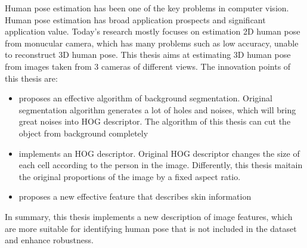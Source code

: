 
\begin{eabstract}
Human pose estimation has been one of the key problems in computer vision. Human pose estimation has broad application prospects and significant application value. Today's research mostly focuses on estimation 2D human pose from monucular camera, which has many problems such as low accuracy, unable to reconstruct 3D human pose. This thesis aims at estimating 3D human pose from images taken from 3 cameras of different views.
The innovation points of this thesis are:
  \begin{itemize}
    \item proposes an effective algorithm of background segmentation. Original segmentation algorithm generates a lot of holes and noises, which will bring great noises into HOG descriptor. The algorithm of this thesis can cut the object from background completely
    \item implements an HOG descriptor. Original HOG descriptor changes the size of each cell according to the person in the image. Differently, this thesis maitain the original proportions of the image by a fixed aspect ratio.
    \item proposes a new effective feature that describes skin information
  \end{itemize}
  
  In summary, this thesis implements a new description of image features, which are more suitable for identifying human pose that is not included in the dataset and enhance robustness.
\end{eabstract}

